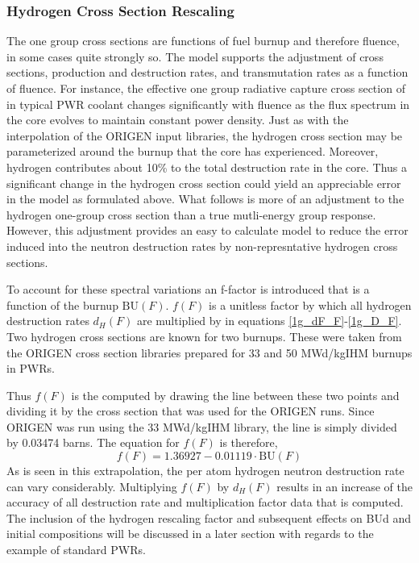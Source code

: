 \subsubsection{Hydrogen Cross Section Rescaling}
\label{1g_sec:H_rescale}
The one group cross sections are functions of fuel burnup and therefore fluence, in some cases quite 
strongly so.  The model supports the adjustment of  cross sections, production 
and destruction rates, and transmutation rates  as a function of fluence.  For instance, the effective 
one group radiative capture cross section of  in typical PWR coolant changes significantly with fluence 
as the flux spectrum in the core evolves to maintain constant power density.  Just as with the interpolation 
of the ORIGEN input libraries, the hydrogen cross section may be parameterized around the burnup that the core 
has experienced.  Moreover, hydrogen contributes about 10\% to the total destruction rate in the core.  
Thus a significant change in the hydrogen cross section could yield an appreciable error in the model as 
formulated above.  What follows is more of an adjustment to the hydrogen one-group cross section than a 
true mutli-energy group response.  However, this adjustment provides an easy to calculate model to 
reduce the error induced into the neutron destruction rates by non-represntative hydrogen cross sections.

To account for these spectral variations an f-factor is introduced that is a function of the burnup 
$\mbox{BU}(F)$.    $f(F)$ is a unitless factor by which all hydrogen destruction rates $d_H(F)$ are 
multiplied by in equations \ref{1g_dF_F}-\ref{1g_D_F}. Two hydrogen cross sections are known for two 
burnups.  These were taken from the ORIGEN cross section libraries prepared for 33 and 50 MWd/kgIHM 
burnups in PWRs.

Thus $f(F)$ is the computed by drawing the line between these two points and dividing it by the cross 
section that was used for the ORIGEN runs.  Since ORIGEN was run using the 33 MWd/kgIHM library, the 
line is simply divided by 0.03474 barns.  The equation for $f(F)$ is therefore, 
\begin{equation}
\label{1g_f_F}
f(F) = 1.36927 - 0.01119 \cdot \mbox{BU}(F)
\end{equation}
As is seen in this extrapolation, the per atom hydrogen neutron destruction rate can vary considerably.  
Multiplying $f(F)$ by $d_H(F)$ results in an increase of the accuracy of all destruction rate and 
multiplication factor data that is computed.  The inclusion of the hydrogen rescaling factor and 
subsequent effects on BUd and initial compositions will be discussed in a later section with regards 
to the example of standard PWRs.  



